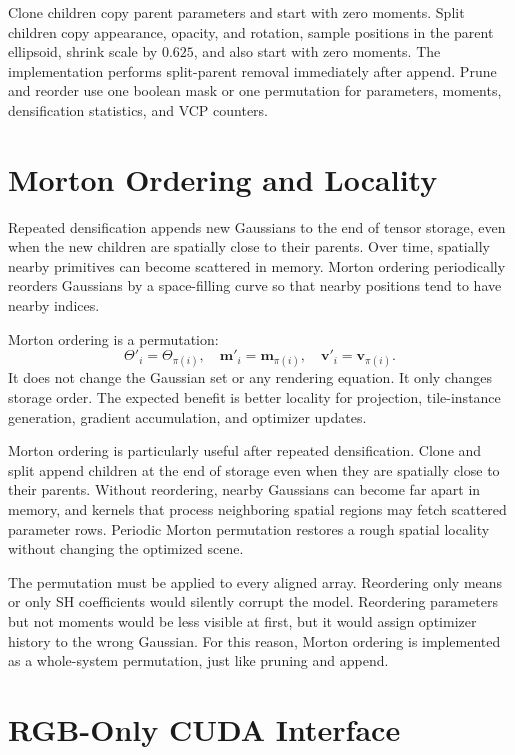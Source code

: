 Clone children copy parent parameters and start with zero moments. Split children copy appearance, opacity, and rotation, sample positions in the parent ellipsoid, shrink scale by $0.625$, and also start with zero moments. The implementation performs split-parent removal immediately after append. Prune and reorder use one boolean mask or one permutation for parameters, moments, densification statistics, and VCP counters.

\section{Morton Ordering and Locality}

Repeated densification appends new Gaussians to the end of tensor storage, even when the new children are spatially close to their parents. Over time, spatially nearby primitives can become scattered in memory. Morton ordering periodically reorders Gaussians by a space-filling curve so that nearby positions tend to have nearby indices.

Morton ordering is a permutation:
\begin{equation}
\Theta'_i=\Theta_{\pi(i)},
\quad
\mathbf{m}'_i=\mathbf{m}_{\pi(i)},
\quad
\mathbf{v}'_i=\mathbf{v}_{\pi(i)}.
\end{equation}
It does not change the Gaussian set or any rendering equation. It only changes storage order. The expected benefit is better locality for projection, tile-instance generation, gradient accumulation, and optimizer updates.

Morton ordering is particularly useful after repeated densification. Clone and split append children at the end of storage even when they are spatially close to their parents. Without reordering, nearby Gaussians can become far apart in memory, and kernels that process neighboring spatial regions may fetch scattered parameter rows. Periodic Morton permutation restores a rough spatial locality without changing the optimized scene.

The permutation must be applied to every aligned array. Reordering only means or only SH coefficients would silently corrupt the model. Reordering parameters but not moments would be less visible at first, but it would assign optimizer history to the wrong Gaussian. For this reason, Morton ordering is implemented as a whole-system permutation, just like pruning and append.

\section{RGB-Only CUDA Interface}

